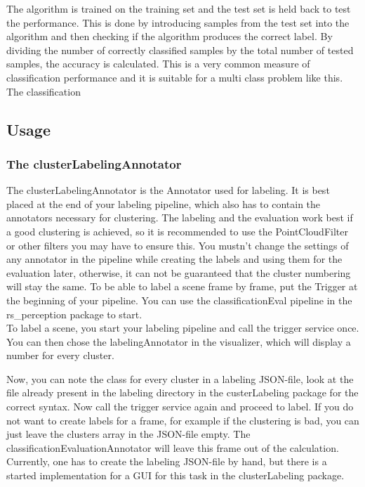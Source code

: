 \documentclass[main.tex]{subfiles}
\begin{document}
The algorithm is trained on the training set and the test set is held back to test the performance. This is done by introducing samples from the test set into the algorithm and then checking if the algorithm produces the correct label. By dividing the number of correctly classified samples by the total number of tested samples, the accuracy is calculated. This is a very common measure of classification performance and it is suitable for a multi class problem like this.\\

The classification 

\subsection{Usage}

\subsubsection{The clusterLabelingAnnotator}
The clusterLabelingAnnotator is the Annotator used for labeling. It is best placed at the end of your labeling pipeline, which also has to contain the annotators necessary for clustering. The labeling and the evaluation work best if a good clustering is achieved, so it is recommended to use the PointCloudFilter or other filters you may have to ensure this. You mustn't change the settings of any annotator in the pipeline while creating the labels and using them for the evaluation later, otherwise, it can not be guaranteed that the cluster numbering will stay the same. To be able to label a scene frame by frame, put the Trigger at the beginning of your pipeline. You can use the classificationEval pipeline in the rs\_perception package to start.\\

To label a scene, you start your labeling pipeline and call the trigger service once. You can then chose the labelingAnnotator in the visualizer, which will display a number for every cluster.
\begin{center}
\end{center}


Now, you can note the class for every cluster in a labeling JSON-file, look at the file already present in the labeling directory in the custerLabeling package for the correct syntax. Now call the trigger service again and proceed to label. If you do not want to create labels for a frame, for example if the clustering is bad, you can just leave the clusters array in the JSON-file empty. The classificationEvaluationAnnotator will leave this frame out of the calculation. Currently, one has to create the labeling JSON-file by hand, but there is a started implementation for a GUI for this task in the clusterLabeling package.
\end{document}
